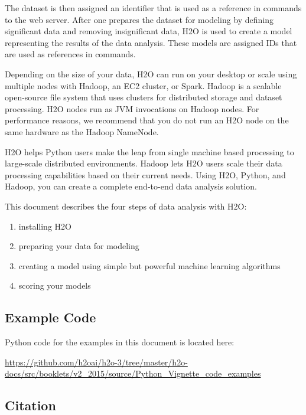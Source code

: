 The dataset is then assigned an identifier that is used as a reference in  commands to the web server.
After one prepares the dataset for modeling by defining significant data and removing insignificant data,
H2O is used to create a model representing the results of the data analysis.
These models are assigned IDs that are used as references in commands.

Depending on the size of your data,  H2O can run on your desktop or scale using multiple nodes with Hadoop,
an EC2 cluster, or Spark.  Hadoop is a scalable open-source file
system that uses clusters for distributed storage and dataset processing. H2O nodes run as JVM invocations on Hadoop
nodes. For performance reasons, we recommend that you do not run an H2O node on the same hardware as the Hadoop
NameNode.

H2O helps Python users make the leap from single machine based processing to large-scale distributed environments.
Hadoop lets H2O users scale their data processing capabilities based on their current needs.
Using H2O, Python, and Hadoop, you can create a complete end-to-end data analysis solution.

This document describes the four steps of data analysis with H2O:
\begin{enumerate}

\item installing H2O
\item preparing your data for modeling
\item creating a model using simple but powerful machine learning algorithms
\item scoring your models

\end{enumerate}

\newpage


\subsection{Example Code}

Python code for the examples in this document is located here:

\url{https://github.com/h2oai/h2o-3/tree/master/h2o-docs/src/booklets/v2_2015/source/Python_Vignette_code_examples}

\subsection{Citation}

